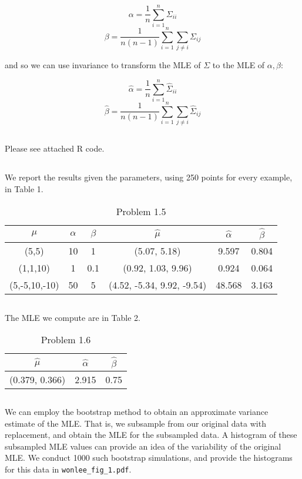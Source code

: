 \documentclass[psamsfonts]{amsart}
\theoremstyle{definition}
\theoremstyle{remark}
\numberwithin{equation}{section}
\begin{document}
$$\alpha = \frac{1}{n}\sum_{i=1}^n\Sigma_{ii}$$
$$\beta = \frac{1}{n(n-1)}\sum_{i=1}^n\sum_{j\neq i} \Sigma_{ij}$$

and so we can use invariance to transform the MLE of $\Sigma$ to the MLE of $\alpha, \beta$:

$$\hat{\alpha} = \frac{1}{n}\sum_{i=1}^n\hat{\Sigma}_{ii}$$
$$\hat{\beta} = \frac{1}{n(n-1)}\sum_{i=1}^n\sum_{j\neq i} \hat{\Sigma}_{ij}$$

\subsection{} Please see attached R code.

\subsection{} We report the results given the parameters, using 250 points for every example, in Table 1.

\begin{table}[h!]
	\begin{tabular}{c|c|c|c|c|c}
		$\mu$ & $\alpha$ &$\beta$&$\hat{\mu}$&$\hat{\alpha}$&$\hat{\beta}$\\\hline
		(5,5)& 10 & 1 & (5.07, 5.18) & 9.597 & 0.804 \\
		(1,1,10) & 1 & 0.1 & (0.92, 1.03, 9.96) & 0.924 & 0.064\\
		(5,-5,10,-10) & 50 & 5 &(4.52, -5.34, 9.92, -9.54) & 48.568 & 3.163\\
	\end{tabular}
	\caption{Problem 1.5}
\end{table}

\subsection{} The MLE we compute are in Table 2.
\begin{table}[h!]
	\begin{tabular}{c|c|c}
		$\hat{\mu}$&$\hat{\alpha}$&$\hat{\beta}$\\\hline
		(0.379, 0.366) & 2.915 & 0.75
	\end{tabular}
	\caption{Problem 1.6}
\end{table}

\subsection{} We can employ the bootstrap method to obtain an approximate variance estimate of the MLE. That is, we subsample from our original data with replacement, and obtain the MLE for the subsampled data. A histogram of these subsampled MLE values can provide an idea of the variability of the original MLE. We conduct 1000 such bootstrap simulations, and provide the histograms for this data in \texttt{wonlee\_fig\_1.pdf}.
\end{document}
